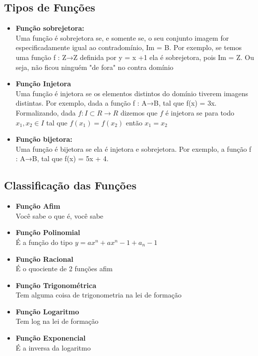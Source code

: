 \documentclass{article}
\begin{document}
\subsection{Tipos de Funções}
\begin{itemize}
    \item \textbf{Função sobrejetora:}\\[10pt] Uma função é sobrejetora se, e somente se, o seu conjunto imagem for especificadamente igual ao contradomínio, Im = B. Por exemplo, se temos uma função f : Z→Z definida por y = x +1 ela é sobrejetora, pois Im = Z. Ou seja, não ficou ninguém "de fora" no contra domínio

    \item \textbf{Função Injetora}\\[10pt] Uma função é injetora se os elementos distintos do domínio tiverem imagens distintas. Por exemplo, dada a função f : A→B, tal que f(x) = 3x.
    \\[5pt]
    Formalizando, dada $f: I \subset R \xrightarrow{} R$ dizemos que $f$ é injetora se para todo $x_1, x_2 \in I$ tal que $f(x_1) = f(x_2)$ então $x_1 = x_2$

    \item \textbf{Função bijetora:}\\[10pt] Uma função é bijetora se ela é injetora e sobrejetora. Por exemplo, a função f : A→B, tal que f(x) = 5x + 4.
\end{itemize}

\subsection{Classificação das Funções}
\begin{itemize}
    \item \textbf{Função Afim} \\[10pt] Você sabe o que é, você sabe
    \item \textbf{Função Polinomial} \\[10pt] É a função do tipo $y = ax^n + ax^n-1 + a_n-1$
    \item \textbf{Função Racional} \\[10pt] É o quociente de 2 funções afim
    \item \textbf{Função Trigonométrica} \\[10pt] Tem alguma coisa de trigonometria na lei de formação
    \item \textbf{Função Logaritmo} \\[10pt] Tem log na lei de formação 
    \item \textbf{Função Exponencial} \\[10pt] É a inversa da logaritmo
\end{itemize}
\end{document}
